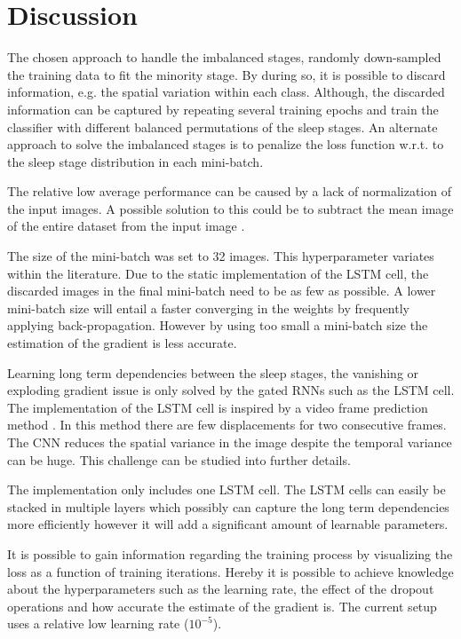 \section{Discussion}
\label{sec:discussion}

The chosen approach to handle the imbalanced stages, randomly down-sampled the training data to fit the minority stage.
By during so, it is possible to discard information, e.g. the spatial variation within each class. 
Although, the discarded information can be captured by repeating several training epochs and train the classifier with different balanced permutations of the sleep stages.
An alternate approach to solve the imbalanced stages is to penalize the loss function w.r.t. to the sleep stage distribution in each mini-batch.

The relative low average performance can be caused by a lack of normalization of the input images. A possible solution to this could be to subtract the mean image of the entire dataset from the input image \cite{	main_ar,VGGnet16}.

The size of the mini-batch was set to 32 images. This hyperparameter variates within the literature. Due to the static implementation of the LSTM cell, the discarded images in the final mini-batch need to be as few as possible. A lower mini-batch size will entail a faster converging in the weights by frequently applying back-propagation. However by using too small a mini-batch size the estimation of the gradient is less accurate.

Learning long term dependencies between the sleep stages, the vanishing or exploding gradient issue is only solved by the gated RNNs such as the LSTM cell. The implementation of the LSTM cell is inspired by a video frame prediction method \cite{git_lstm}. In this method there are few displacements for two consecutive frames. The CNN reduces the spatial variance in the image despite the temporal variance can be huge. This challenge can be studied into further details.

The implementation only includes one LSTM cell. The LSTM cells can easily be stacked in multiple layers which possibly can capture the long term dependencies more efficiently however it will add a significant amount of learnable parameters.

It is possible to gain information regarding the training process by visualizing the loss as a function of training iterations. 
Hereby it is possible to achieve knowledge about the hyperparameters such as the learning rate, the effect of the dropout operations and how accurate the estimate of the gradient is. The current setup uses a relative low learning rate ($10^{-5}$). 

